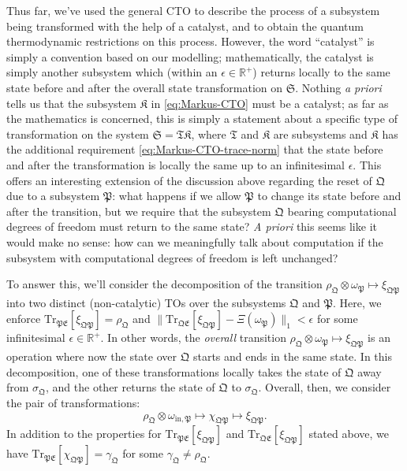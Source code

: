 \documentclass[preprints,article,accept,moreauthors,pdftex]{Definitions/mdpi}
\begin{document}
\begin{paracol}{2}
Thus far, we've used the general CTO to describe the process of a subsystem being transformed with the help of a catalyst, and to obtain the quantum thermodynamic restrictions on this process. However, the word ``catalyst'' is simply a convention based on our modelling; mathematically, the catalyst is simply another subsystem which (within an $\epsilon \in \mathbb{R}^{+}$) returns locally to the same state before and after the overall state transformation on $\mathfrak{S}$. Nothing \emph{a priori} tells us that the subsystem $\mathfrak{K}$ in \eqref{eq:Markus-CTO} must be a catalyst; as far as the mathematics is concerned, this is simply a statement about a specific type of transformation on the system $\mathfrak{S} = \mathfrak{TK}$, where $\mathfrak{T}$ and $\mathfrak{K}$ are subsystems and $\mathfrak{K}$ has the additional requirement \eqref{eq:Markus-CTO-trace-norm} that the state before and after the transformation is locally the same up to an infinitesimal $\epsilon$. This offers an interesting extension of the discussion above regarding the reset of $\mathfrak{Q}$ due to a subsystem $\mathfrak{P}$: what happens if we allow $\mathfrak{P}$ to change its state before and after the transition, but we require that the subsystem $\mathfrak{Q}$ bearing computational degrees of freedom must return to the same state? \emph{A priori} this seems like it would make no sense: how can we meaningfully talk about computation if the subsystem with computational degrees of freedom is left unchanged?

To answer this, we'll consider the decomposition of the transition $\rho_{\mathfrak{Q}} \otimes \omega_{\mathfrak{P}} \mapsto \xi_{\mathfrak{QP}}$ into two distinct (non-catalytic) TOs over the subsystems $\mathfrak{Q}$ and $\mathfrak{P}$. Here, we enforce $\mathrm{Tr}_{\mathfrak{PE}}\left[\xi_{\mathfrak{QP}}\right] = \rho_{\mathfrak{Q}}$ and $\lVert\mathrm{Tr}_{\mathfrak{QE}}\left[\xi_{\mathfrak{QP}}\right] - \Xi\left(\omega_{\mathfrak{P}}\right)\rVert_{1} < \epsilon$ for some infinitesimal $\epsilon \in \mathbb{R}^{+}$. In other words, the \emph{overall} transition $\rho_{\mathfrak{Q}} \otimes \omega_{\mathfrak{P}} \mapsto \xi_{\mathfrak{QP}}$ is an operation where now the state over $\mathfrak{Q}$ starts and ends in the same state. In this decomposition, one of these transformations locally takes the state of $\mathfrak{Q}$ away from $\sigma_{\mathfrak{Q}}$, and the other returns the state of $\mathfrak{Q}$ to $\sigma_{\mathfrak{Q}}$. Overall, then, we consider the pair of transformations:
\begin{equation}
    \label{eq:RC-CTO-composition-general}
    \rho_{\mathfrak{Q}}\otimes\omega_{\mathrm{in},\mathfrak{P}} \mapsto \chi_{\mathfrak{QP}} \mapsto \xi_{\mathfrak{QP}}.
\end{equation}
In addition to the properties for $\mathrm{Tr}_{\mathfrak{PE}}\left[\xi_{\mathfrak{QP}}\right]$ and $\mathrm{Tr}_{\mathfrak{QE}}\left[\xi_{\mathfrak{QP}}\right]$ stated above, we have $\mathrm{Tr}_{\mathfrak{PE}}\left[\chi_{\mathfrak{QP}}\right] = \gamma_{\mathfrak{Q}}$ for some $\gamma_{\mathfrak{Q}} \ne \rho_{\mathfrak{Q}}$.


\end{paracol}
\end{document}
